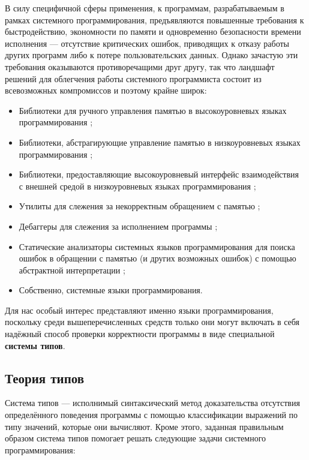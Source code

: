 \documentclass[12pt]{article}
\begin{document}
В силу специфичной сферы применения, к программам, разрабатываемым в рамках
системного программирования, предъявляются повышенные требования к
быстродействию, экономности по памяти и одновременно безопасности времени
исполнения --- отсутствие критических ошибок, приводящих к отказу работы других
программ либо к потере пользовательских данных. Однако зачастую эти требования
оказываются противоречащими друг другу, так что ландшафт решений для облегчения
работы системного программиста состоит из всевозможных компромиссов и
поэтому крайне широк:

\begin{itemize}
  \item Библиотеки для ручного управления памятью в высокоуровневых языках \\
    программирования \cite{haskell:st} \cite{scala:alien-memory};
  \item Библиотеки, абстрагирующие управление памятью в низкоуровневых языках \\
    программирования \cite{c:tgc};
  \item Библиотеки, предоставляющие высокоуровневый интерфейс взаимодействия \\
    с внешней средой в низкоуровневых языках программирования \cite{cpp:stl};
  \item Утилиты для слежения за некорректным обращением с памятью
    \cite{valgrind};
  \item Дебаггеры для слежения за исполнением программы \cite{gdb};
  \item Статические анализаторы системных языков программирования для поиска
    ошибок в обращении с памятью (и других возможных ошибок) с помощью
    абстрактной интерпретации \cite{pvs-studio};
  \item Собственно, системные языки программирования.
\end{itemize}

Для нас особый интерес представляют именно языки программирования, поскольку
среди вышеперечисленных средств только они могут включать в себя надёжный способ
проверки корректности программы в виде специальной \textbf{системы типов}.

\subsection{Теория типов}

Система типов --- исполнимый синтаксический метод доказательства отсутствия
определённого поведения программы с помощью классификации выражений по типу
значений, которые они вычисляют. \cite{pierce} Кроме этого, заданная правильным
образом система типов помогает решать следующие задачи системного
программирования:
\end{document}

